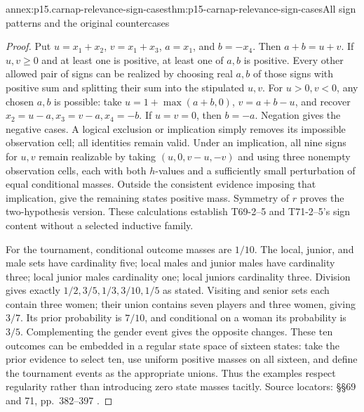 \begin{annexitem}{annex:p15.carnap-relevance-sign-cases}{thm:p15-carnap-relevance-sign-cases}{All sign patterns and the original countercases}
\begin{proof}
Put \(u=x_1+x_2\), \(v=x_1+x_3\),
\(a=x_1\), and \(b=-x_4\). Then \(a+b=u+v\).
If \(u,v\geq0\) and at least one is positive, at least one of
\(a,b\) is positive. Every other allowed pair of signs can be
realized by choosing real \(a,b\) of those signs with positive
sum and splitting their sum into the stipulated \(u,v\).
For \(u>0,v<0\), any chosen \(a,b\) is possible: take
\(u=1+\max(a+b,0)\), \(v=a+b-u\), and recover
\(x_2=u-a,x_3=v-a,x_4=-b\). If \(u=v=0\), then
\(b=-a\). Negation gives the negative cases. A logical exclusion
or implication simply removes its impossible observation cell; all
identities remain valid. Under an implication, all nine signs for
\(u,v\) remain realizable by taking \((u,0,v-u,-v)\) and
using three nonempty observation cells, each with both \(h\)-values
and a sufficiently small perturbation of equal conditional masses.
Outside the consistent evidence imposing that implication, give the
remaining states positive mass. Symmetry of \(r\) proves the
two-hypothesis version. These calculations establish T69-2--5 and
T71-2--5's sign content without a selected inductive family.

For the tournament, conditional outcome masses are \(1/10\).
The local, junior, and male sets have cardinality five; local males
and junior males have cardinality three; local junior males cardinality
one; local juniors cardinality three. Division gives exactly
\(1/2,3/5,1/3,3/10,1/5\) as stated. Visiting and senior sets
each contain three women; their union contains seven players and
three women, giving \(3/7\). Its prior probability is \(7/10\),
and conditional on a woman its probability is \(3/5\). Complementing
the gender event gives the opposite changes. These ten outcomes can
be embedded in a regular state space of sixteen states: take the
prior evidence to select ten, use uniform positive masses on all
sixteen, and define the tournament events as the appropriate unions.
Thus the examples respect regularity rather than introducing zero
state masses tacitly. Source locators: §§69 and 71, pp.~382--397
\cite{Carnap1950Probability}.
\end{proof}
\end{annexitem}

